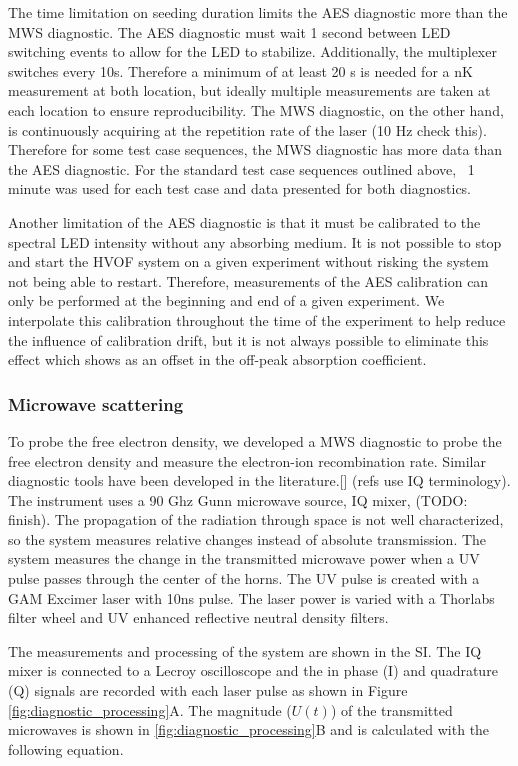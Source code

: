 The time limitation on seeding duration limits the AES diagnostic more than the MWS diagnostic. The AES diagnostic must wait 1 second between LED switching events to allow for the LED to stabilize. Additionally, the multiplexer switches every 10s. Therefore a minimum of at least 20 s is needed for a nK measurement at both location, but ideally multiple measurements are taken at each location to ensure reproducibility. The MWS diagnostic, on the other hand, is continuously acquiring at the repetition rate of the laser (10 Hz check this). Therefore for some test case sequences, the MWS diagnostic has more data than the AES diagnostic. For the standard test case sequences outlined above, ~1 minute was used for each test case and data presented for both diagnostics.  

Another limitation of the AES diagnostic is that it must be calibrated to the spectral LED intensity without any absorbing medium. It is not possible to stop and start the HVOF system on a given experiment without risking the system not being able to restart. Therefore, measurements of the AES calibration can only be performed at the beginning and end of a given experiment. We interpolate this calibration throughout the time of the experiment to help reduce the influence of calibration drift, but it is not always possible to eliminate this effect which shows as an offset in the off-peak absorption coefficient.

\subsubsection{Microwave scattering}

To probe the free electron density, we developed a MWS diagnostic to probe the free electron density and measure the electron-ion recombination rate. Similar diagnostic tools have been developed in the literature.[] (refs use IQ terminology). The instrument uses a 90 Ghz Gunn microwave source, IQ mixer, (TODO: finish). The propagation of the radiation through space is not well characterized, so the system measures relative changes instead of absolute transmission. The system measures the change in the transmitted microwave power when a UV pulse passes through the center of the horns. The UV pulse is created with a GAM Excimer laser with 10ns pulse. The laser power is varied with a Thorlabs filter wheel and UV enhanced reflective neutral density filters. 

The measurements and processing of the system are shown in the SI. The IQ mixer is connected to a Lecroy oscilloscope and the in phase (I) and quadrature (Q) signals are recorded with each laser pulse as shown in Figure \ref{fig:diagnostic_processing}A. The magnitude ($U(t)$) of the transmitted microwaves is shown in \ref{fig:diagnostic_processing}B and is calculated with the following equation. 

